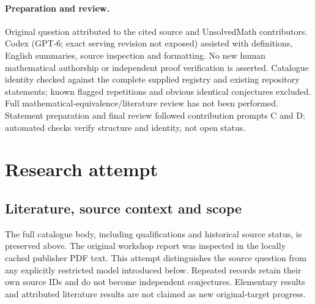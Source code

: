 \documentclass[11pt]{article}
\begin{document}
\paragraph{Preparation and review.}
Original question attributed to the cited source and UnsolvedMath contributors. Codex (GPT-6; exact serving revision not exposed) assisted with definitions, English summaries, source inspection and formatting. No new human mathematical authorship or independent proof verification is asserted. Catalogue identity checked against the complete supplied registry and existing repository statements; known flagged repetitions and obvious identical conjectures excluded. Full mathematical-equivalence/literature review has not been performed. Statement preparation and final review followed contribution prompts C and D; automated checks verify structure and identity, not open status.
\label{end:statement}

\section{Research attempt}
\subsection{Literature, source context and scope}
The full catalogue body, including qualifications and historical source status, is preserved above. The original workshop report was inspected in the locally cached publisher PDF text. This attempt distinguishes the source question from any explicitly restricted model introduced below. Repeated records retain their own source IDs and do not become independent conjectures. Elementary results and attributed literature results are not claimed as new original-target progress.
\end{document}
